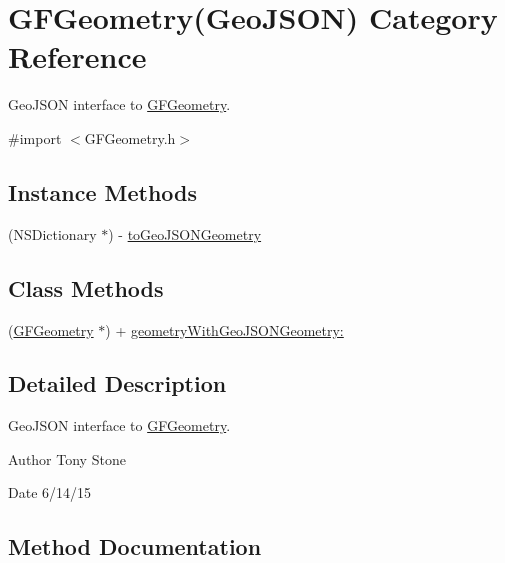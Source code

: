 \hypertarget{category_g_f_geometry_07_geo_j_s_o_n_08}{}\section{G\+F\+Geometry(Geo\+J\+S\+O\+N) Category Reference}
\label{category_g_f_geometry_07_geo_j_s_o_n_08}


Geo\+J\+S\+O\+N interface to \hyperlink{interface_g_f_geometry}{G\+F\+Geometry}.  




{\ttfamily \#import $<$G\+F\+Geometry.\+h$>$}

\subsection*{Instance Methods}
\begin{DoxyCompactItemize}
\item 
(N\+S\+Dictionary $\ast$) -\/ \hyperlink{category_g_f_geometry_07_geo_j_s_o_n_08_a89a1dd53c1d9a51fd5b933fde28be5b7}{to\+Geo\+J\+S\+O\+N\+Geometry}
\end{DoxyCompactItemize}
\subsection*{Class Methods}
\begin{DoxyCompactItemize}
\item 
(\hyperlink{interface_g_f_geometry}{G\+F\+Geometry} $\ast$) + \hyperlink{category_g_f_geometry_07_geo_j_s_o_n_08_afcdd23bd5dd4b04868d6baf577f9bb32}{geometry\+With\+Geo\+J\+S\+O\+N\+Geometry\+:}
\end{DoxyCompactItemize}


\subsection{Detailed Description}
Geo\+J\+S\+O\+N interface to \hyperlink{interface_g_f_geometry}{G\+F\+Geometry}. 

\begin{DoxyAuthor}{Author}
Tony Stone 
\end{DoxyAuthor}
\begin{DoxyDate}{Date}
6/14/15 
\end{DoxyDate}


\subsection{Method Documentation}
\hypertarget{category_g_f_geometry_07_geo_j_s_o_n_08_afcdd23bd5dd4b04868d6baf577f9bb32}{}
